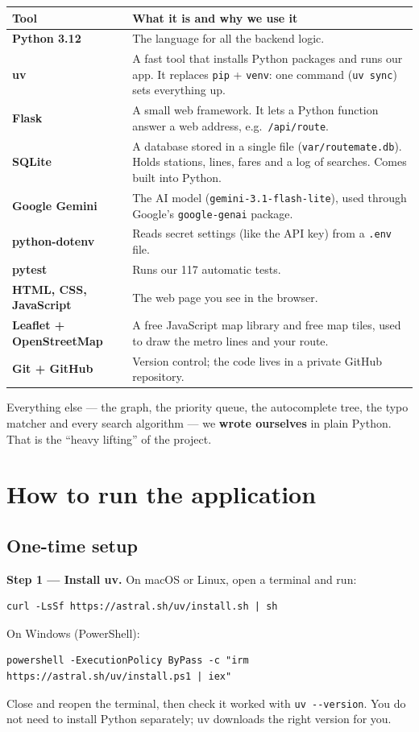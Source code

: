 \documentclass[11pt,a4paper]{article}
\newcommand{\file}[1]{\texttt{\color{accent}#1}}
\begin{document}
\renewcommand{\arraystretch}{1.25}
\begin{tabularx}{\linewidth}{@{}>{\bfseries}l X@{}}
\toprule
Tool & What it is and why we use it \\
\midrule
Python 3.12 & The language for all the backend logic. \\
uv & A fast tool that installs Python packages and runs our app. It replaces
      \texttt{pip} + \texttt{venv}: one command (\texttt{uv sync}) sets everything up. \\
Flask & A small web framework. It lets a Python function answer a web address,
        e.g.\ \texttt{/api/route}. \\
SQLite & A database stored in a single file (\file{var/routemate.db}). Holds stations,
         lines, fares and a log of searches. Comes built into Python. \\
Google Gemini & The AI model (\texttt{gemini-3.1-flash-lite}), used through Google's
                \texttt{google-genai} package. \\
python-dotenv & Reads secret settings (like the API key) from a \texttt{.env} file. \\
pytest & Runs our 117 automatic tests. \\
HTML, CSS, JavaScript & The web page you see in the browser. \\
Leaflet + OpenStreetMap & A free JavaScript map library and free map tiles, used to draw
                          the metro lines and your route. \\
Git + GitHub & Version control; the code lives in a private GitHub repository. \\
\bottomrule
\end{tabularx}

Everything else --- the graph, the priority queue, the autocomplete tree, the typo
matcher and every search algorithm --- we \textbf{wrote ourselves} in plain Python.
That is the ``heavy lifting'' of the project.

\section{How to run the application}

\subsection{One-time setup}

\textbf{Step 1 --- Install uv.} On macOS or Linux, open a terminal and run:
\begin{lstlisting}[style=shell]
curl -LsSf https://astral.sh/uv/install.sh | sh
\end{lstlisting}
On Windows (PowerShell):
\begin{lstlisting}[style=shell]
powershell -ExecutionPolicy ByPass -c "irm https://astral.sh/uv/install.ps1 | iex"
\end{lstlisting}
Close and reopen the terminal, then check it worked with \texttt{uv -{}-version}.
You do not need to install Python separately; uv downloads the right version for you.
\end{document}
